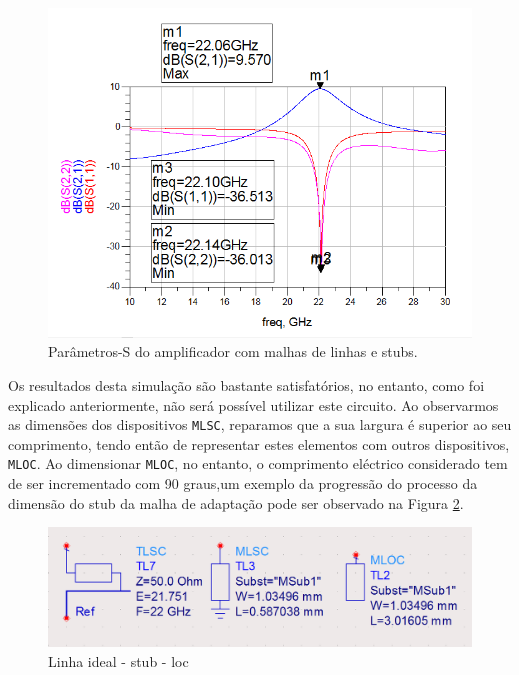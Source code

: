 \documentclass[11pt]{article}
\numberwithin{equation}{section}
\begin{document}
\begin{figure}[H]
	\centering
	\includegraphics[keepaspectratio=true, scale=0.45]{exps/mf_stub_S}
	\vspace{-0.5em}
	\caption{Parâmetros-S do amplificador com malhas de linhas e stubs.}
	\vspace{-0.8em}
	\label{fig:mf_stub_S}
\end{figure}

Os resultados desta simulação são bastante satisfatórios, no entanto, como foi explicado anteriormente, não será possível utilizar este circuito. Ao observarmos as dimensões dos dispositivos \texttt{MLSC}, reparamos que a sua largura é superior ao seu comprimento, tendo então de representar estes elementos com outros dispositivos, \texttt{MLOC}. Ao dimensionar \texttt{MLOC}, no entanto, o comprimento eléctrico considerado tem de ser incrementado com 90 graus,um exemplo da progressão do processo da dimensão do stub da malha de adaptação pode ser observado na Figura \ref{fig:stub_fail}.

\begin{figure}[H]
	\centering
	\includegraphics[keepaspectratio=true, scale=0.3]{exps/stub_fail}
	\vspace{-0.5em}
	\caption{Linha ideal - stub - loc}
	\vspace{-0.8em}
	\label{fig:stub_fail}
\end{figure}
\end{document}
